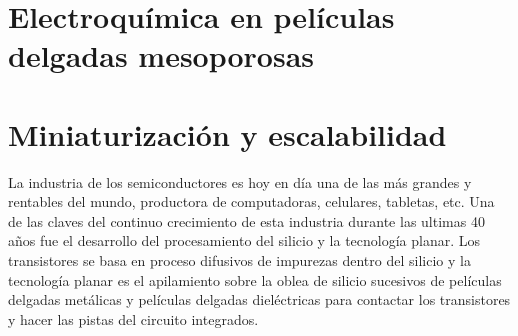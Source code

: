 	 	

\section{Electroquímica en películas delgadas mesoporosas}
	
\section{Miniaturización y escalabilidad}\label{sec:microfabricacion}\label{sec:intro_fotolito}
	



		La industria de los semiconductores es hoy en día una de las más grandes y rentables del mundo, productora de computadoras, celulares, tabletas, etc. Una de las claves del continuo crecimiento de esta industria durante las ultimas 40 años fue el desarrollo del procesamiento del silicio y la tecnología planar. Los transistores se basa en proceso difusivos de impurezas dentro del silicio y la tecnología planar es el apilamiento sobre la oblea de silicio sucesivos de películas delgadas metálicas y  películas delgadas dieléctricas para contactar los transistores y hacer las pistas del circuito integrados. 

